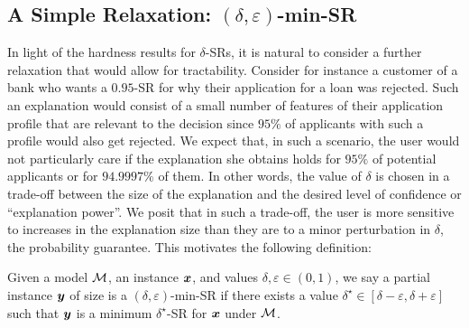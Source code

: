 \subsection{\texorpdfstring{A Simple Relaxation: $(\delta, \varepsilon)$-min-SR}{A Simple Relaxation: (delta, epsilon)-min-SR}}

In light of the hardness results for $\delta$-SRs, it is natural to consider a further relaxation that would allow for tractability. Consider for instance a customer of a bank who wants a $0.95$-SR for why their application for a loan was rejected. Such an explanation would consist of a small number of features of their application profile that are relevant to the decision since $95\%$ of applicants with such a profile would also get rejected. We expect that, in such a scenario, the user would not particularly care if the explanation she obtains holds 
for $95\%$ of potential applicants or for $94.9997\%$ of them. In other words, the value of $\delta$ is chosen in a trade-off between the size of the explanation and the desired level of confidence or ``explanation power''. We posit that in such a trade-off, the user is more sensitive to increases in the explanation size than they are to a minor perturbation in $\delta$, the probability guarantee.  This motivates the following definition:


\begin{definition}
    Given a model $\mathcal{M}$, an instance ${\bm{x}}$, and values $\delta, \varepsilon \in (0, 1)$, we say a partial instance ${\bm{y}}$ of size is a $(\delta, \varepsilon)$-min-SR if there exists a value $\delta^\star \in [\delta - \varepsilon, \delta + \varepsilon]$ such that
    ${\bm{y}}$ is a minimum $\delta^\star$-SR for ${\bm{x}}$ under $\mathcal{M}$.
\end{definition}

